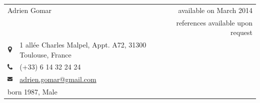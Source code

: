 \documentclass[10pt]{article}
\begin{document}
\begin{tabular}[ht]{clr}
	\multicolumn{2}{l}{\LARGE Adrien Gomar} & {\large available on March 2014} \\
	& & \phantom{aaaaaaaaaaaaaaaaaaaa} {references available upon request} \\
	\includegraphics[height=9pt]{pictures/icon-map.pdf} & 1 allée Charles Malpel, Appt. A72, 31300 Toulouse, France \\
	\includegraphics[height=9pt]{pictures/icon-phone.pdf} & (+33) 6 14 32 24 24 \\
	\includegraphics[height=9pt]{pictures/icon-mail.pdf} & \href{mailto:adrien.gomar@gmail.com}{adrien.gomar@gmail.com} \\
	\multicolumn{2}{l}{born 1987, Male} & \\
\end{tabular}
\end{document}
